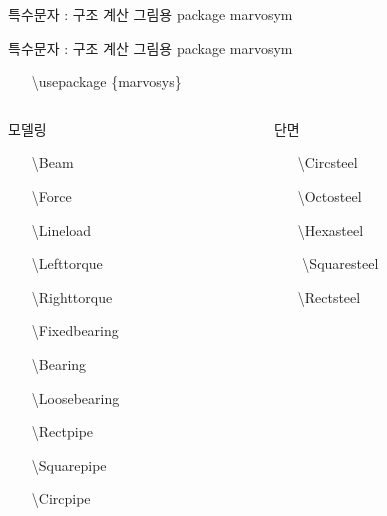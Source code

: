 \documentclass[ aspectratio=169,  12pt,blue,xcolor=pdftex,dvipsnames,table,handout,notes]{beamer}
\begin{document}
		\begin{frame}[t,shrink=0]{특수문자 : 구조 계산 그림용 package marvosym}


			\begin{block}{특수문자 : 구조 계산 그림용 package marvosym}
			\begin{itemize}
			\item[] \textbackslash usepackage \{marvosys\}
			\end{itemize}
			\end{block}

			\begin{columns}[t]
			\begin{column}{.4\textwidth}
			\begin{block} { 모델링 }

			\begin{enumerate}
			\item[\Beam			]	\textbackslash Beam	
			\item[\Force			]	\textbackslash Force	
			\item[\Lineload		]	\textbackslash Lineload	
			\item[\Lefttorque		]	\textbackslash Lefttorque	
			\item[\Righttorque		]	\textbackslash Righttorque	
			\item[\Fixedbearing	]	\textbackslash Fixedbearing	
			\item[\Bearing		]	\textbackslash Bearing
			\item[\Loosebearing	]	\textbackslash Loosebearing	

			\item[\Rectpipe		]	\textbackslash Rectpipe
			\item[\Squarepipe		]	\textbackslash Squarepipe	
			\item[\Circpipe		]	\textbackslash Circpipe	
			\end{enumerate}

			\end{block}
			\end{column}

			\begin{column}{.4\textwidth}
			\begin{block} { 단면 }
			\begin{enumerate}
			\item[\Circsteel		]	\textbackslash Circsteel	
			\item[\Octosteel		]	\textbackslash Octosteel	
			\item[\Hexasteel		]	\textbackslash Hexasteel
			\item[\Squaresteel		]	\textbackslash Squaresteel	
			\item[\Rectsteel		]	\textbackslash Rectsteel	


\end{enumerate}
\end{block}
\end{column}
\end{columns}
\end{frame}
\end{document}
